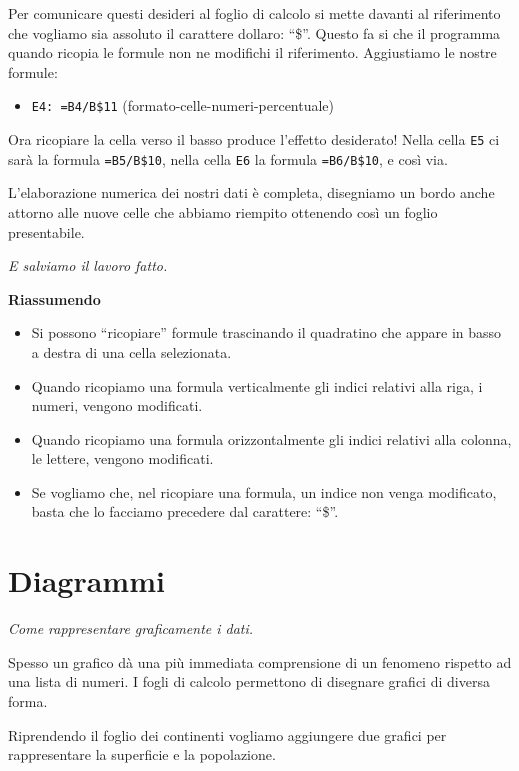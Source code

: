 Per comunicare questi desideri al foglio di calcolo si mette davanti
al riferimento che vogliamo sia assoluto il carattere dollaro: ``\$''.
Questo fa si che il programma quando ricopia le formule non ne modifichi
il riferimento.
Aggiustiamo le nostre formule:

\begin{itemize} [noitemsep]
\item \texttt{E4: =B4/B\$11}
(formato-celle-numeri-percentuale)
\end{itemize}

Ora ricopiare la cella verso il basso produce l'effetto desiderato!
Nella cella \texttt{E5} ci sarà la formula \texttt{=B5/B\$10},
nella cella \texttt{E6} la formula \texttt{=B6/B\$10}, e così via.

L'elaborazione numerica dei nostri dati è completa,
disegniamo un bordo anche attorno alle nuove celle che abbiamo
riempito ottenendo così un foglio presentabile.

\emph{E salviamo il lavoro fatto.}

\textbf{Riassumendo}
\begin{itemize} [nosep]
\item 
Si possono ``ricopiare'' formule trascinando il quadratino che appare in
basso a destra di una cella selezionata.
\item 
Quando ricopiamo una formula verticalmente gli indici relativi alla riga,
i numeri, vengono modificati.
\item 
Quando ricopiamo una formula orizzontalmente gli indici relativi alla
colonna, le lettere, vengono modificati.
\item 
Se vogliamo che, nel ricopiare una formula, un indice non venga modificato,
basta che lo facciamo precedere dal carattere: ``\$''.
\end{itemize}

\section{Diagrammi}
\label{05_01_f_di_calc:diagrammi}

\emph{Come rappresentare graficamente i dati.}

Spesso un grafico dà una più immediata comprensione di un fenomeno rispetto
ad una lista di numeri.
I fogli di calcolo permettono di disegnare grafici di diversa forma.

Riprendendo il foglio dei continenti vogliamo aggiungere due grafici per
rappresentare la superficie e la popolazione.

